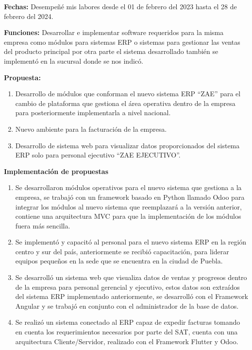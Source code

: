 \documentclass[protocolo.tex]{subfiles}
\begin{document}
\textbf{Fechas:}
Desempeñé mis labores desde el 01 de febrero del 2023 hasta el 28 de febrero del 2024.


\textbf{Funciones:}
Desarrollar e implementar software requeridos para la misma empresa como módulos para
sistemas ERP o sistemas para gestionar las ventas del producto principal por otra parte el
sistema desarrollado también se implementó en la sucursal donde se nos indicó.



\textbf{Propuesta:}
\begin{enumerate}
\item Desarrollo de módulos que conforman el nuevo sistema ERP “ZAE” para el cambio de
plataforma que gestiona el área operativa dentro de la empresa para posteriormente
implementarla a nivel nacional.
\item Nuevo ambiente para la facturación de la empresa.
\item Desarrollo de sistema web para visualizar datos proporcionados del sistema ERP solo
para personal ejecutivo “ZAE EJECUTIVO”.

\end{enumerate}

\textbf{Implementación de propuestas}
\begin{enumerate}
\item Se desarrollaron módulos operativos para el nuevo sistema que gestiona a la empresa, se
trabajó con un framework basado en Python llamado Odoo para integrar los módulos al
nuevo sistema que reemplazará a la versión anterior, contiene una arquitectura MVC para
que la implementación de los módulos fuera más sencilla.


\item Se implementó y capacitó al personal para el nuevo sistema ERP en la región centro y
sur del país, anteriormente se recibió capacitación, para liderar equipos pequeños en la sede
que se encuentra en la ciudad de Puebla.


\item Se desarrolló un sistema web que visualiza datos de ventas y progresos dentro de la
empresa para personal gerencial y ejecutivo, estos datos son extraídos del sistema ERP
implementado anteriormente, se desarrolló con el Framework Angular y se trabajó en
conjunto con el administrador de la base de datos.

\item Se realizó un sistema conectado al ERP capaz de expedir facturas tomando en cuenta
los requerimientos necesarios por parte del SAT, cuenta con una arquitectura
Cliente/Servidor, realizado con el Framework Flutter y Odoo.


\end{enumerate}
\end{document}
